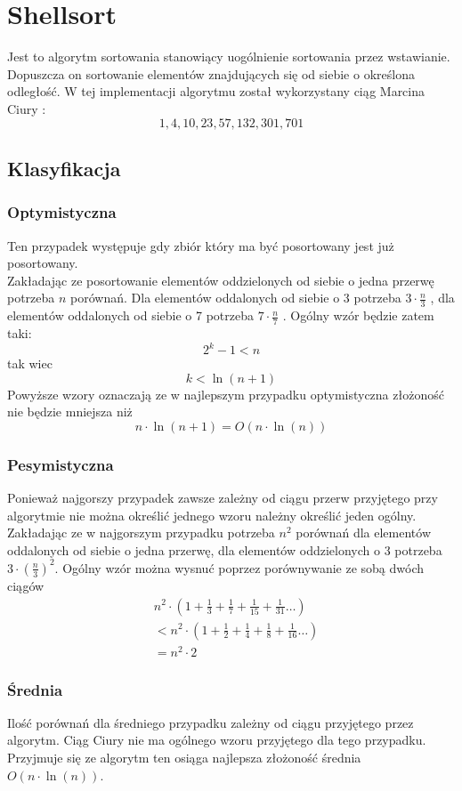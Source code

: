 

\section{Shellsort}
Jest to algorytm sortowania stanowiący uogólnienie sortowania przez wstawianie\cite{shell}. Dopuszcza on sortowanie elementów znajdujących się od siebie o określona odległość. W tej implementacji algorytmu został wykorzystany ciąg Marcina Ciury :
\begin{equation*}
 	1 , 4 , 10 , 23 , 57 , 132 , 301 , 701 
\end{equation*}
\subsection{Klasyfikacja}
\subsubsection{Optymistyczna}
Ten przypadek występuje gdy zbiór który ma być posortowany jest już posortowany.\\
Zakładając ze posortowanie elementów oddzielonych od siebie o jedna przerwę potrzeba $n$ porównań. Dla elementów oddalonych od siebie o 3 potrzeba $3 \cdot \frac{n}{3}$ ,
dla elementów oddalonych od siebie o 7 potrzeba $7 \cdot \frac{n}{7}$ . Ogólny wzór będzie zatem taki:
\begin{equation*}
2^k -1 < n
\end{equation*}
tak wiec 
\begin{equation*}
k < \ln(n+1)
\end{equation*}
Powyższe wzory oznaczają ze w najlepszym przypadku optymistyczna złożoność nie będzie mniejsza niż 
\begin{equation*}
n \cdot \ln(n+1) = O(n\cdot \ln(n))
\end{equation*}
\subsubsection{Pesymistyczna}
Ponieważ najgorszy przypadek zawsze zależny od ciągu przerw przyjętego przy algorytmie nie można określić jednego wzoru należny określić jeden ogólny.
Zakładając ze w najgorszym przypadku potrzeba $n^2$ porównań dla elementów oddalonych od siebie o jedna przerwę, dla elementów oddzielonych o 3 potrzeba $3 \cdot (\frac{n}{3})^2$.
Ogólny wzór można wysnuć poprzez porównywanie ze sobą dwóch ciągów
\begin{align*}
& n^2 \cdot (1 +\frac{1}{3}+\frac{1}{7}+\frac{1}{15}+\frac{1}{31} \ldots )\\
&< n^2 \cdot (1 +\frac{1}{2}+\frac{1}{4}+\frac{1}{8}+\frac{1}{16} \ldots )\\
& = n^2 \cdot  2
\end{align*}
\subsubsection{Średnia}
Ilość porównań dla średniego przypadku zależny od ciągu przyjętego przez algorytm. Ciąg Ciury\cite{shellCiura} nie ma ogólnego wzoru przyjętego dla tego przypadku. Przyjmuje się ze algorytm ten osiąga najlepsza złożoność średnia $O(n \cdot \ln(n))$.


